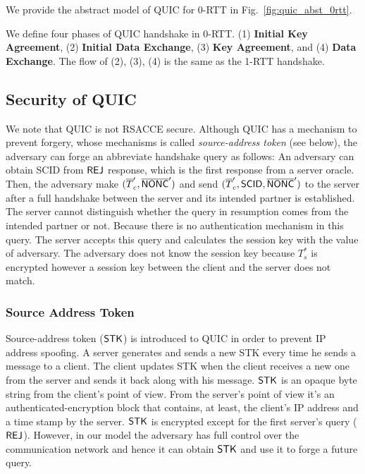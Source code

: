 We provide the abstract model of QUIC for 0-RTT in
Fig.~\ref{fig:quic_abst_0rtt}.
%

%
We define four phases of QUIC handshake in 0-RTT.
(1) \textbf{Initial Key Agreement},
(2) \textbf{Initial Data Exchange},
(3) \textbf{Key Agreement}, and
(4) \textbf{Data Exchange}.
The flow of (2), (3), (4) is the same as the 1-RTT
handshake.



\subsection{Security of QUIC} \label{sec:quic_detail}

We note that QUIC is not RSACCE secure.
Although QUIC has a mechanism to prevent forgery,
whose mechanisms is called \textit{source-address token}
(see below), the adversary can forge an abbreviate handshake
query as follows: An adversary can obtain SCID from $\mathsf{REJ}$
response, which is the first response from a server oracle.
Then, the adversary make $(\overline{T}_c^{\prime},
\overline{\mathsf{NONC}}^{\prime})$ and send $(\overline{T}_c^{\prime},
\mathsf{SCID}, \overline{\mathsf{NONC}}^{\prime})$ to the server after a
full handshake between the server and its intended partner
is established.
The server cannot distinguish whether the query in resumption
comes from the intended partner or not. Because there is no
authentication mechanism in this query. The server accepts
this query and calculates the session key with the value
of adversary.
The adversary does not know the session key because
$T_s^{\ast}$ is encrypted however a session key between the
client and the server does not match.

\subsubsection{Source Address Token} \label{sec:source_address_token}
Source-address token ($\mathsf{STK}$) is introduced to QUIC in order to
prevent IP address spoofing.
A server generates and sends a new STK every time he sends a
message to a client.
The client updates STK when the client receives a new one from
the server and sends it back along with his message.
$\mathsf{STK}$ is an opaque byte string from the client's point of view.
From the server's point of view it's an authenticated-encryption
block that contains, at least, the client's IP address and a time
stamp by the server.
$\mathsf{STK}$ is encrypted except for the first server's query ($\mathsf{REJ}$).
However, in our model the adversary has full control over the
communication network and hence it can obtain $\mathsf{STK}$ and use it to
forge a future query.